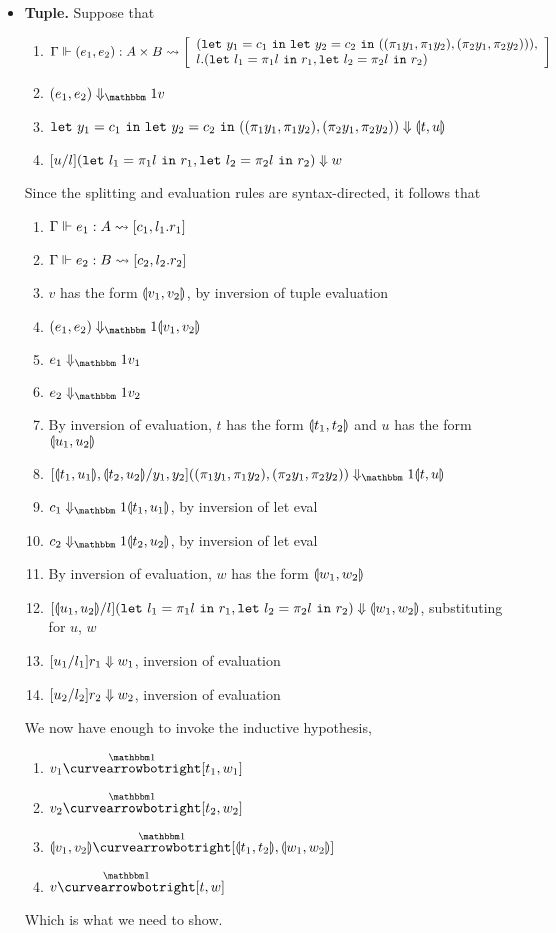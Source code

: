\documentclass{article}
\begin{document}
\begin{itemize}
\item {\bf Tuple.} Suppose that
\begin{enumerate}
\item ${\Gamma} \Vdash {(e_1,e_2)}:{A\times B} \rightsquigarrow \left[{ \begin{array}{l}
		({\tt let}~{y_1} = {c_1}~{\tt in}~{{\tt let}~{y_2} = {c_2}~{\tt in}~{((\pi_1 y_1, \pi_1 y_2),(\pi_2 y_1, \pi_2 y_2))}}), \\
		l.({\tt let}~{l_1} = {\pi_1 l}~{\tt in}~{r_1},{\tt let}~{l_2} = {\pi_2 l}~{\tt in}~{r_2})
		\end{array}}\right] $
\item $\reduceone{(e_1,e_2)}{v}$
\item ${{\tt let}~{y_1} = {c_1}~{\tt in}~{{\tt let}~{y_2} = {c_2}~{\tt in}~{((\pi_1 y_1, \pi_1 y_2),(\pi_2 y_1, \pi_2 y_2))}}} \Downarrow {\llparenthesis{t},{u}\rrparenthesis}$
\item ${[u/l]({\tt let}~{l_1} = {\pi_1 l}~{\tt in}~{r_1},{\tt let}~{l_2} = {\pi_2 l}~{\tt in}~{r_2})} \Downarrow {w}$
\end{enumerate}
Since the splitting and evaluation rules are syntax-directed, it follows that
\begin{enumerate}
\item ${\Gamma} \Vdash {e_1}:{A} \rightsquigarrow \left[{c_1,l_1.r_1}\right]$
\item ${\Gamma} \Vdash {e_2}:{B} \rightsquigarrow \left[{c_2,l_2.r_2}\right]$
\item $v$ has the form $\llparenthesis{v_1},{v_2}\rrparenthesis$, by inversion of tuple evaluation
\item $\reduceone{(e_1,e_2)}{\valprod{v_1}{v_2}}$
\item $\reduceone{e_1}{v_1}$
\item $\reduceone{e_2}{v_2}$
\item By inversion of evaluation, $t$ has the form $\llparenthesis{t_1},{t_2}\rrparenthesis$  and $u$ has the form $\llparenthesis{u_1},{u_2}\rrparenthesis$
\item $\reduceone{[\valprod{t_1}{u_1},\valprod{t_2}{u_2}/y_1,y_2]((\pi_1 y_1, \pi_1 y_2),(\pi_2 y_1, \pi_2 y_2))}{\valprod tu}$
\item $\reduceone{c_1}{\valprod {t_1}{u_1}}$, by inversion of let eval
\item $\reduceone{c_2}{\valprod {t_2}{u_2}}$, by inversion of let eval
\item By inversion of evaluation, $w$ has the form $\llparenthesis{w_1},{w_2}\rrparenthesis$
\item ${[\llparenthesis{u_1},{u_2}\rrparenthesis/l]({\tt let}~{l_1} = {\pi_1 l}~{\tt in}~{r_1},{\tt let}~{l_2} = {\pi_2 l}~{\tt in}~{r_2})} \Downarrow {\llparenthesis{w_1},{w_2}\rrparenthesis}$, substituting for $u$, $w$
\item ${[u_1/l_1]r_1} \Downarrow {w_1}$, inversion of evaluation
\item ${[u_2/l_2]r_2} \Downarrow {w_2}$, inversion of evaluation
\end{enumerate}
We now have enough to invoke the inductive hypothesis,
\begin{enumerate}
\item $v_1 \vsplito [t_1,w_1]$ 
\item $v_2 \vsplito [t_2,w_2]$ 
\item $\valprod{v_1}{v_2} \vsplito [\valprod{t_1}{t_2},\valprod{w_1}{w_2}]$ 
\item $v \vsplito [t,w]$
\end{enumerate}
Which is what we need to show.
\end{itemize}
\end{document}
